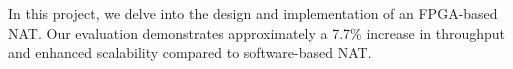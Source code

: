
In this project, we delve into the design and implementation of an FPGA-based NAT. Our evaluation demonstrates approximately a 7.7\% increase in throughput and enhanced scalability compared to software-based NAT.
